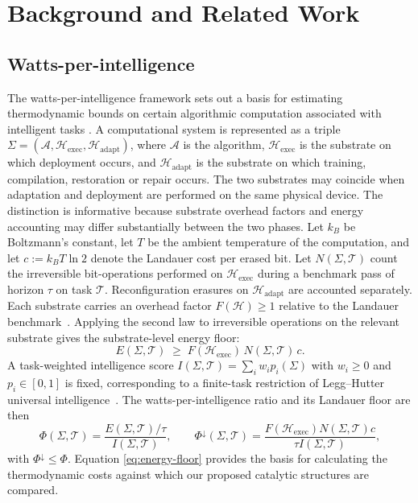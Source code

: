 \documentclass[runningheads]{llncs}
\newcommand{\WPI}{\Phi}
\newcommand{\kBT}{k_B T}
\newcommand{\Erasure}{c}
\newcommand{\IntOp}{I}
\newcommand{\Sys}{\Sigma}
\newcommand{\Nop}{N}
\newcommand{\Fover}{F}
\newcommand{\Alg}{\mathcal{A}}
\newcommand{\Hw}{\mathcal{H}}
\newcommand{\Task}{\mathcal{T}}
\begin{document}
\section{Background and Related Work}
\label{sec:background}

\subsection{Watts-per-intelligence}

The watts-per-intelligence framework sets out a basis for estimating thermodynamic bounds on certain algorithmic computation associated with intelligent tasks \cite{perrier2025watts}. A computational system is represented as a triple
$\Sys=(\Alg,\Hw_{\mathrm{exec}},\Hw_{\mathrm{adapt}})$, where $\Alg$
is the algorithm, $\Hw_{\mathrm{exec}}$ is the substrate on which
deployment occurs, and $\Hw_{\mathrm{adapt}}$ is the substrate on
which training, compilation, restoration or repair occurs. The two
substrates may coincide when adaptation and deployment are performed
on the same physical device. The distinction is informative because substrate overhead factors and energy accounting may differ
substantially between the two phases. Let $k_B$ be Boltzmann's
constant, let $T$ be the ambient temperature of the computation, and
let $\Erasure:=\kBT\ln 2$ denote the Landauer cost per erased bit. Let $\Nop(\Sys,\Task)$ count the irreversible bit-operations performed
on $\Hw_{\mathrm{exec}}$ during a benchmark pass of horizon $\tau$ on
task $\Task$. Reconfiguration erasures on $\Hw_{\mathrm{adapt}}$ are
accounted separately. Each substrate carries an overhead factor
$\Fover(\Hw)\ge 1$ relative to the Landauer benchmark~\cite{perrier2025watts,frank2005introduction,athas1994low}. Applying the second law to irreversible operations on the relevant
substrate gives the substrate-level energy floor:
\begin{equation}
\label{eq:energy-floor}
E(\Sys,\Task)\;\ge\;\Fover(\Hw_{\mathrm{exec}})\,\Nop(\Sys,\Task)\,
\Erasure.
\end{equation}
A task-weighted intelligence score
$\IntOp(\Sys,\Task)=\sum_i w_i p_i(\Sys)$ with $w_i\ge 0$ and
$p_i\in[0,1]$ is fixed, corresponding to a finite-task restriction
of Legg--Hutter universal intelligence~\cite{legg_universal_2007,hutter2004universal}. The watts-per-intelligence ratio and its
Landauer floor are then
\begin{equation}
\label{eq:wpi}
\WPI(\Sys,\Task)=\frac{E(\Sys,\Task)/\tau}{\IntOp(\Sys,\Task)},
\qquad
\WPI^{\downarrow}(\Sys,\Task)
=\frac{\Fover(\Hw_{\mathrm{exec}})\Nop(\Sys,\Task)\Erasure}
{\tau\IntOp(\Sys,\Task)},
\end{equation}
with $\WPI^\downarrow\le\WPI$. 
Equation 
\eqref{eq:energy-floor} provides the basis for calculating the thermodynamic costs against which our proposed catalytic structures are compared.
\end{document}
